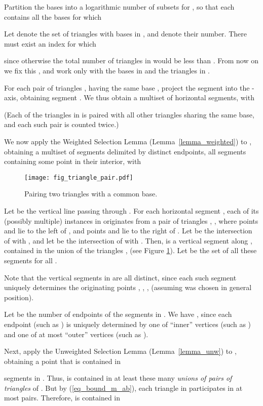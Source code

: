 \documentclass[11pt]{article}
\begin{document}
Partition the bases into a logarithmic number of subsets  for , so that each  contains
all the bases  for which

Let  denote the set of triangles
with bases in , and  denote their number. There
must exist an index  for which

since otherwise the total number of triangles in  would be less
than . From now on we fix this , and work only with the
bases in  and the triangles in .

For each pair of triangles ,  having the same base , project the segment  into the -axis, obtaining segment
. We thus obtain a multiset  of horizontal segments, with

(Each of the  triangles in  is paired with all other
triangles sharing the same base, and each such pair is counted
twice.)

We now apply the Weighted Selection Lemma
(Lemma~\ref{lemma_weighted}) to , obtaining a multiset  of
segments delimited by  distinct endpoints, all segments
containing some point  in their interior, with



\begin{figure}
\centerline{\texttt{[image: fig\_triangle\_pair.pdf]}}
\caption{\label{fig_triangle_pair} Pairing two triangles with a
common base.}
\end{figure}

Let  be the vertical line passing through . For each
horizontal segment , each of its (possibly multiple)
instances in  originates from a pair of triangles , ,
where points  and  lie to the left of , and points 
and  lie to the right of . Let  be the intersection of
 with , and let  be the intersection of  with
. Then,  is a vertical segment along , contained in
the union of the triangles ,  (see Figure
\ref{fig_triangle_pair}). Let  be the set of all these segments
 for all .

Note that the vertical segments in  are all distinct, since
each such segment  uniquely determines the originating points
, , ,  (assuming  was chosen in general position).

Let  be the number of endpoints of the segments in . We
have , since each endpoint (such as ) is uniquely
determined by one of  ``inner'' vertices (such as ) and one
of at most  ``outer'' vertices (such as ).

Next, apply the Unweighted Selection Lemma (Lemma~\ref{lemma_unw})
to , obtaining a point  that is contained in

segments in . Thus,  is contained in at least these many
\emph{unions of pairs of triangles} of . But by
(\ref{eq_bound_m_ab}), each triangle in  participates in at
most  pairs. Therefore,  is contained in
\end{document}

